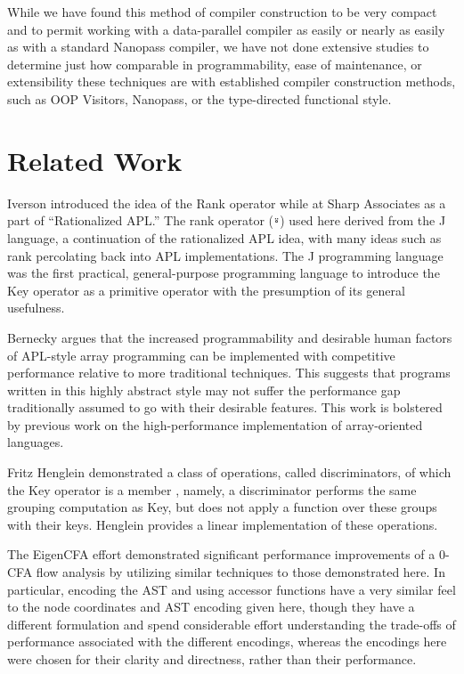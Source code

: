 ﻿\documentclass[numbers,10pt,preprint]{sigplanconf}
\begin{document}
While we have found this method of compiler construction to be very compact and to permit working with a data-parallel compiler as easily or nearly as easily as with a standard Nanopass compiler, we have not done extensive studies to determine just how comparable in programmability, ease of maintenance, or extensibility these techniques are with established compiler construction methods, such as OOP Visitors, Nanopass, or the type-directed functional style.

\section{Related Work}

Iverson introduced the idea of the Rank operator while at Sharp Associates \cite{iverson1983rationalized} as a part of ``Rationalized APL.'' The rank operator (\verb;⍤;) used here derived from the J language, a continuation of the rationalized APL idea, with many ideas such as rank percolating back into APL implementations. \cite{bernecky1987rank,hui1995rank} The J programming language \cite{hui2014key} was the first practical, general-purpose programming language to introduce the Key operator as a primitive operator with the presumption of its general usefulness.

Bernecky \cite{bernecky2015abstract} argues that the increased programmability and desirable human factors of APL-style array programming can be implemented with competitive performance relative to more traditional techniques. This suggests that programs written in this highly abstract style may not suffer the performance gap traditionally assumed to go with their desirable features. This work is bolstered by previous work on the high-performance implementation of array-oriented languages. \cite{ching1994experimental,ching1993primitive, ching1990automatic,ju1991exploitation, ju1991performance,bernecky1999reducing,schwarz1991acorn}

Fritz Henglein demonstrated a class of operations, called discriminators, of which the Key operator is a member \cite{henglein2013dd} , namely, a discriminator performs the same grouping computation as Key, but does not apply a function over these groups with their keys. Henglein provides a linear implementation of these operations.

The EigenCFA effort \cite{prabhu2011eigencfa} demonstrated significant performance improvements of a 0-CFA flow analysis by utilizing similar techniques to those demonstrated here. In particular, encoding the AST and using accessor functions have a very similar feel to the node coordinates and AST encoding given here, though they have a different formulation and spend considerable effort understanding the trade-offs of performance associated with the different encodings, whereas the encodings here were chosen for their clarity and directness, rather than their performance.
\end{document}
